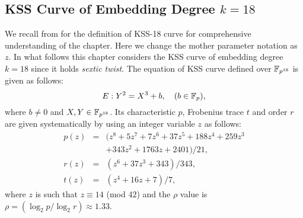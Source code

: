 
\subsection{KSS Curve of Embedding Degree \texorpdfstring{$k=18$}{\textit{k=18}}}
We recall  from  for the definition of KSS-18 curve for comprehensive understanding of the chapter.
Here we change the mother parameter notation as $z$.
In what follows this chapter considers the KSS curve of  embedding degree $k=18$ since it holds \textit{sextic twist}. 
The equation of KSS curve defined over $\mathbb{F}_{p^{18}}$ is given as follows:
\begin{equation}\label{eqn_kss18curve_chapter_g2scm_kss18}
E:Y^2=X^3+b, \quad \mbox{($b \in {\mathbb{F}}_{p}$)},
\end{equation}
where $b \neq 0$ and $X,Y \in \mathbb{F}_{p^{18}}$. Its characteristic $p$, Frobenius trace $t$ and order $r$ are given systematically by using an integer variable $z$ as follows:
\begin{subequations}
\begin{eqnarray}
p(z) &= & (z^8 +5z^7 +7z^6 +37z^5 +188z^4 +259z^3  \nonumber \\ 								
& & + 343z^2 +1763z+2401)/21,\\\label{eq:kss_char_chapter_g2scm_kss18}
r(z) &= &(z^6 + 37z^3 + 343)/343,\label{eq:kss_degree_chapter_g2scm_kss18}  \\
t(z) &=& (z^4 + 16z + 7)/7, \label{eq:kss_trace_chapter_g2scm_kss18} 
\end{eqnarray}
\end{subequations} 
where $z$ is such that $z \equiv 14$ (mod $42$) and the $\rho$ value is $\rho = (\log_2 p/\log_2 r) \approx 1.33$.

